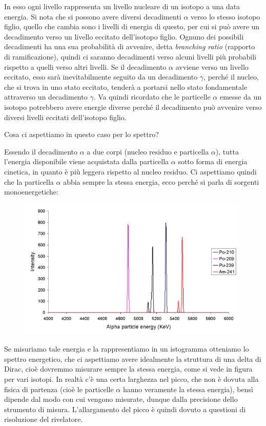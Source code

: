 \vspace{-0.5cm}In esso ogni livello rappresenta un livello nucleare di un isotopo a una data energia. Si nota che si possono avere diversi decadimenti $\alpha$ verso lo stesso isotopo figlio, quello che cambia sono i livelli di energia di questo, per cui si può avere un decadimento verso un livello eccitato dell'isotopo figlio. Ognuno dei possibili decadimenti ha una sua probabilità di avvenire, detta \textit{branching ratio} (rapporto di ramificazione), quindi ci saranno decadimenti verso alcuni livelli più probabili rispetto a quelli verso altri livelli. Se il decadimento $\alpha$ avviene verso un livello eccitato, esso sarà inevitabilmente seguito da un decadimento $\gamma$, perché il nucleo, che si trova in uno stato eccitato, tenderà a portarsi nello stato fondamentale attraverso un decadimento $\gamma$. Va quindi ricordato che le particelle $\alpha$ emesse da un isotopo potrebbero avere energie diverse perché il decadimento può avvenire verso diversi livelli eccitati dell'isotopo figlio.

\vspace{0.2cm}Cosa ci aspettiamo in questo caso per lo spettro?

Essendo il decadimento $\alpha$ a due corpi (nucleo residuo e particella $\alpha$), tutta l'energia disponibile viene acquistata dalla particella $\alpha$ sotto forma di energia cinetica, in quanto è più leggera rispetto al nucleo residuo. Ci aspettiamo quindi che la particella $\alpha$ abbia sempre la stessa energia, ecco perché si parla di sorgenti monoenergetiche:

\vspace{-0.5cm}\begin{figure}[H]
    \centering
    \includegraphics[width=11cm]{immagini/spettro_decadimento_alpha.png}
\end{figure}

\vspace{-0.5cm}Se misuriamo tale energia e la rappresentiamo in un istogramma otteniamo lo spettro energetico, che ci aspettiamo avere idealmente la struttura di una delta di Dirac, cioè dovremmo misurare sempre la stessa energia, come si vede in figura per vari isotopi. In realtà c'è una certa larghezza nel picco, che non è dovuta alla fisica di partenza (cioè le particelle $\alpha$ hanno veramente la stessa energia), bensì dipende dal modo con cui vengono misurate, dunque dalla precisione dello strumento di misura. L'allargamento del picco è quindi dovuto a questioni di risoluzione del rivelatore.

